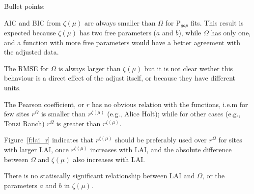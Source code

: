 \documentclass[a4paper,11pt]{report}
\begin{document}
Bullet points:
\begin{item}
 \item AIC and BIC from $\zeta(\mu)$ are always smaller than $\Omega$ for P$_{gap}$ fits. This result is expected because $\zeta(\mu)$ has two free parameters ($a$ and $b$), while $\Omega$ has only one, and a function with more free parameters would have a better agreement with the adjusted data.
 \item The RMSE for $\Omega$ is always larger than $\zeta(\mu)$ but it is not clear wether this behaviour is a direct effect of the adjust itself, or because they have different units.
\item The Pearson coefficient, or $r$ has no obvious relation with the functions, i.e.m for few sites $r^{\Omega}$ is smaller than  $r^{\zeta(\mu)}$ (e.g., Alice Holt); while for other cases (e.g., Tonzi Ranch) $r^{\Omega}$ is greater than $r^{\zeta(\mu)}$.
\item Figure~\ref{f:lai_r} indicates that $r^{\zeta(\mu)}$ should be preferably used over $r^{\Omega}$ for sites with larger LAI, once $r^{\zeta(\mu)}$ increases with LAI, and the absolute difference between $\Omega$ and $\zeta(\mu)$ also increases with LAI.
\item There is no statiscally significant relationship between LAI and $\Omega$, or the parameters $a$ and $b$ in $\zeta(\mu)$.
\end{item}







\newpage
\pagestyle{plain}


%
%




\end{document}
